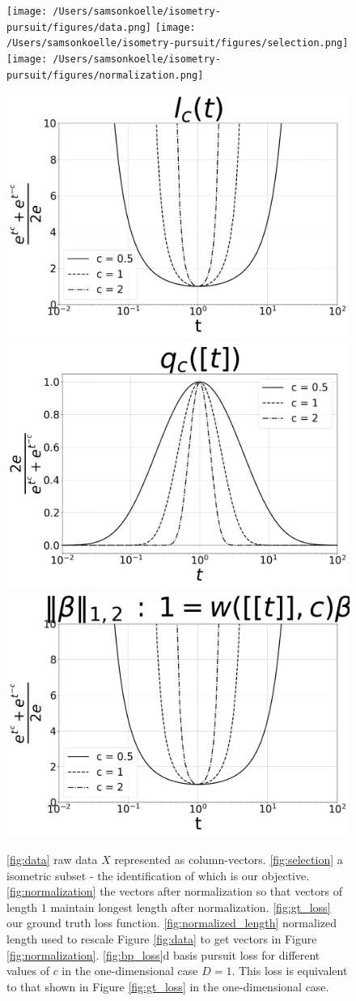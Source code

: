 \begin{figure}
\centering
{\texttt{[image: /Users/samsonkoelle/isometry-pursuit/figures/data.png]}}
{\texttt{[image: /Users/samsonkoelle/isometry-pursuit/figures/selection.png]}}
{\texttt{[image: /Users/samsonkoelle/isometry-pursuit/figures/normalization.png]}}

{\includegraphics[width = .32\textwidth]{../figures/Figure_1a_bw.png}}
{\includegraphics[width = .32\textwidth]{../figures/Figure_1b_bw.png}}
{\includegraphics[width = .32\textwidth]{../figures/Figure_1c_bw.png}}

\caption{\ref{fig:data} raw data $X$ represented as column-vectors.
 \ref{fig:selection} a isometric subset - the identification of which is our objective.
 \ref{fig:normalization} the vectors after normalization so that vectors of length $1$ maintain longest length after normalization.
 \ref{fig:gt_loss} our ground truth loss function.
 \ref{fig:normalized_length} normalized length used to rescale Figure \ref{fig:data} to get vectors in Figure \ref{fig:normalization}.
 \ref{fig:bp_loss}d basis pursuit loss for different values of $c$ in the one-dimensional case $D = 1$. 
This loss is equivalent to that shown in Figure \ref{fig:gt_loss} in the one-dimensional case.
\label{fig:losses}
}
\end{figure}


